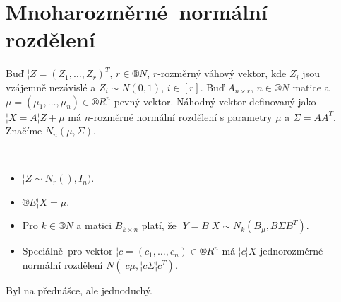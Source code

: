 \documentclass[12pt]{article}					%
\begin{document}

\section{Mnoharozměrné normální rozdělení}
\begin{definice}
	Buď $¦Z = (Z_1, …, Z_r)^T$, $r \in ®N$, $r$-rozměrný váhový vektor, kde $Z_i$ jsou vzájemně nezávislé a $Z_i \sim N(0, 1)$, $i \in [r]$. Buď $A_{n \times r}$, $n \in ®N$ matice a $\mu = (\mu_1, …, \mu_n) \in ®R^n$ pevný vektor. Náhodný vektor definovaný jako $¦X = A¦Z + \mu$ má $n$-rozměrné normální rozdělení s parametry $\mu$ a $\Sigma = A A^T$. Značíme $N_n(\mu, \Sigma)$.
\end{definice}

\begin{dusledek}
	\ 
	\begin{itemize}
		\item $¦Z \sim N_r(), I_n)$.
		\item $®E ¦X = \mu$.
		\item Pro $k \in ®N$ a matici $B_{k \times n}$ platí, že $¦Y = B ¦X \sim N_k(B_\mu, B \Sigma B^T)$.
		\item Speciálně pro vektor $¦c = (c_1, …, c_n) \in ®R^n$ má $¦c¦X$ jednorozměrné normální rozdělení $N(¦c \mu, ¦c \Sigma ¦c^T)$.
	\end{itemize}

	\begin{dukazin}
		Byl na přednášce, ale jednoduchý.
	\end{dukazin}
\end{dusledek}
\end{document}
